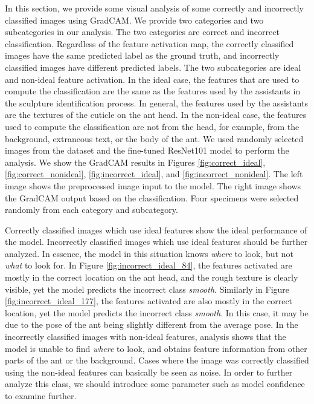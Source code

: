 \documentclass{aci}
\numberwithin{equation}{section}
\begin{document}
In this section, we provide some visual analysis of some correctly and
incorrectly classified images using GradCAM. We provide two categories and two
subcategories in our analysis. The two categories are correct and incorrect
classification. Regardless of the feature activation map, the correctly
classified images have the same predicted label as the ground truth, and
incorrectly classified images have different predicted labels. The two
subcategories are ideal and non-ideal feature activation. In the ideal case, the
features that are used to compute the classification are the same as the
features used by the assistants in the sculpture identification process. In
general, the features used by the assistants are the textures of the cuticle on
the ant head. In the non-ideal case, the features used to compute the
classification are not from the head, for example, from the background,
extraneous text, or the body of the ant. We used randomly selected images from
the dataset and the fine-tuned ResNet101 model to perform the analysis. We show
the GradCAM results in Figures \ref{fig:correct_ideal},
\ref{fig:correct_nonideal}, \ref{fig:incorrect_ideal}, and
\ref{fig:incorrect_nonideal}. The left image shows the preprocessed image input
to the model. The right image shows the GradCAM output based on the
classification. Four specimens were selected randomly from each category and
subcategory.

Correctly classified images which use ideal features show the ideal performance
of the model. Incorrectly classified images which use ideal features should be
further analyzed. In essence, the model in this situation knows \textit{where}
to look, but not \textit{what} to look for. In Figure
\ref{fig:incorrect_ideal_84}, the features activated are mostly in the correct
location on the ant head, and the rough texture is clearly visible, yet the
model predicts the incorrect class \textit{smooth}. Similarly in Figure
\ref{fig:incorrect_ideal_177}, the features activated are also mostly in the
correct location, yet the model predicts the incorrect class \textit{smooth}. In
this case, it may be due to the pose of the ant being slightly different from
the average pose. In the incorrectly classified images with non-ideal features,
analysis shows that the model is unable to find \textit{where} to look, and
obtains feature information from other parts of the ant or the background. Cases
where the image was correctly classified using the non-ideal features can
basically be seen as noise. In order to further analyze this class, we should
introduce some parameter such as model confidence to examine further.
\end{document}
